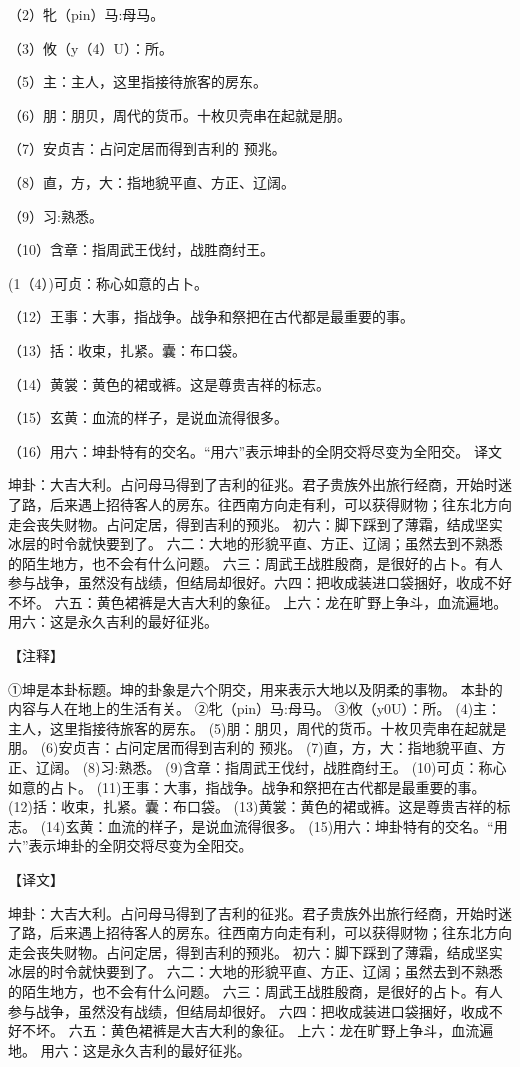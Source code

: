\documentclass[a4paper,12pt,UTF8,twoside]{ctexbook}
\begin{document}
（2）牝（pin）马:母马。

（3）攸（y（4）U）：所。

（5）主：主人，这里指接待旅客的房东。

（6）朋：朋贝，周代的货币。十枚贝壳串在起就是朋。

（7）安贞吉：占问定居而得到吉利的 预兆。

（8）直，方，大：指地貌平直、方正、辽阔。

（9）习:熟悉。

（10）含章：指周武王伐纣，战胜商纣王。

(1（4）)可贞：称心如意的占卜。

（12）王事：大事，指战争。战争和祭把在古代都是最重要的事。

（13）括：收束，扎紧。囊：布口袋。

（14）黄裳：黄色的裙或裤。这是尊贵吉祥的标志。

（15）玄黄：血流的样子，是说血流得很多。

（16）用六：坤卦特有的交名。“用六”表示坤卦的全阴交将尽变为全阳交。
译文

坤卦：大吉大利。占问母马得到了吉利的征兆。君子贵族外出旅行经商，开始时迷了路，后来遇上招待客人的房东。往西南方向走有利，可以获得财物；往东北方向走会丧失财物。占问定居，得到吉利的预兆。 初六：脚下踩到了薄霜，结成坚实冰层的时令就快要到了。 六二：大地的形貌平直、方正、辽阔；虽然去到不熟悉的陌生地方，也不会有什么问题。 六三：周武王战胜殷商，是很好的占卜。有人参与战争，虽然没有战绩，但结局却很好。六四：把收成装进口袋捆好，收成不好不坏。 六五：黄色裙裤是大吉大利的象征。 上六：龙在旷野上争斗，血流遍地。 用六：这是永久吉利的最好征兆。


【注释】

①坤是本卦标题。坤的卦象是六个阴交，用来表示大地以及阴柔的事物。 本卦的内容与人在地上的生活有关。
②牝（pin）马:母马。
③攸（y0U）：所。
(4)主：主人，这里指接待旅客的房东。
(5)朋：朋贝，周代的货币。十枚贝壳串在起就是朋。
(6)安贞吉：占问定居而得到吉利的 预兆。
(7)直，方，大：指地貌平直、方正、辽阔。
(8)习:熟悉。
(9)含章：指周武王伐纣，战胜商纣王。
(10)可贞：称心如意的占卜。
(11)王事：大事，指战争。战争和祭把在古代都是最重要的事。
(12)括：收束，扎紧。囊：布口袋。
(13)黄裳：黄色的裙或裤。这是尊贵吉祥的标志。
(14)玄黄：血流的样子，是说血流得很多。
(15)用六：坤卦特有的交名。“用六”表示坤卦的全阴交将尽变为全阳交。

【译文】

坤卦：大吉大利。占问母马得到了吉利的征兆。君子贵族外出旅行经商，开始时迷了路，后来遇上招待客人的房东。往西南方向走有利，可以获得财物；往东北方向走会丧失财物。占问定居，得到吉利的预兆。
初六：脚下踩到了薄霜，结成坚实冰层的时令就快要到了。
六二：大地的形貌平直、方正、辽阔；虽然去到不熟悉的陌生地方，也不会有什么问题。
六三：周武王战胜殷商，是很好的占卜。有人参与战争，虽然没有战绩，但结局却很好。
六四：把收成装进口袋捆好，收成不好不坏。
六五：黄色裙裤是大吉大利的象征。
上六：龙在旷野上争斗，血流遍地。
用六：这是永久吉利的最好征兆。
\end{document}
